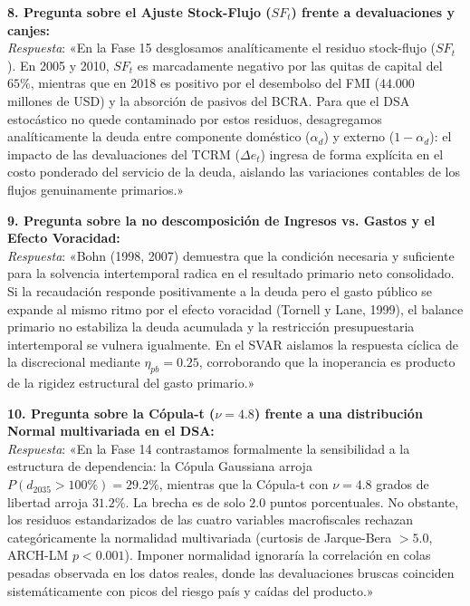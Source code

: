 \documentclass[11pt,a4paper]{article}
\begin{document}
\begin{mdframed}[style=infobox]
\vspace{0.2cm}
\textbf{8. Pregunta sobre el Ajuste Stock-Flujo ($SF_t$) frente a devaluaciones y canjes:}\\
\textit{Respuesta}: «En la Fase 15 desglosamos analíticamente el residuo stock-flujo ($SF_t$). En 2005 y 2010, $SF_t$ es marcadamente negativo por las quitas de capital del $65\%$, mientras que en 2018 es positivo por el desembolso del FMI ($44.000$ millones de USD) y la absorción de pasivos del BCRA. Para que el DSA estocástico no quede contaminado por estos residuos, desagregamos analíticamente la deuda entre componente doméstico ($\alpha_d$) y externo ($1 - \alpha_d$): el impacto de las devaluaciones del TCRM ($\Delta e_t$) ingresa de forma explícita en el costo ponderado del servicio de la deuda, aislando las variaciones contables de los flujos genuinamente primarios.»

\vspace{0.2cm}
\textbf{9. Pregunta sobre la no descomposición de Ingresos vs. Gastos y el Efecto Voracidad:}\\
\textit{Respuesta}: «Bohn (1998, 2007) demuestra que la condición necesaria y suficiente para la solvencia intertemporal radica en el resultado primario neto consolidado. Si la recaudación responde positivamente a la deuda pero el gasto público se expande al mismo ritmo por el efecto voracidad (Tornell y Lane, 1999), el balance primario no estabiliza la deuda acumulada y la restricción presupuestaria intertemporal se vulnera igualmente. En el SVAR aislamos la respuesta cíclica de la discrecional mediante $\eta_{pb} = 0.25$, corroborando que la inoperancia es producto de la rigidez estructural del gasto primario.»

\vspace{0.2cm}
\textbf{10. Pregunta sobre la Cópula-t ($\nu = 4.8$) frente a una distribución Normal multivariada en el DSA:}\\
\textit{Respuesta}: «En la Fase 14 contrastamos formalmente la sensibilidad a la estructura de dependencia: la Cópula Gaussiana arroja $P(d_{2035} > 100\%) = 29.2\%$, mientras que la Cópula-t con $\nu = 4.8$ grados de libertad arroja $31.2\%$. La brecha es de solo $2.0$ puntos porcentuales. No obstante, los residuos estandarizados de las cuatro variables macrofiscales rechazan categóricamente la normalidad multivariada (curtosis de Jarque-Bera $> 5.0$, ARCH-LM $p < 0.001$). Imponer normalidad ignoraría la correlación en colas pesadas observada en los datos reales, donde las devaluaciones bruscas coinciden sistemáticamente con picos del riesgo país y caídas del producto.»


\end{mdframed}
\end{document}
